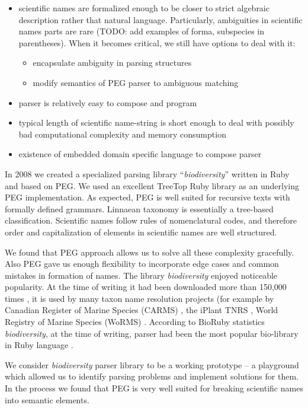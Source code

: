 \documentclass{bmcart}
\begin{document}
\begin{itemize}
  \item scientific names are formalized enough to be closer to strict
  algebraic description rather that natural language. Particularly,
  ambiguities in scientific names parts are rare (TODO:  add examples of forma,
  subspecies in parentheses). When it becomes critical, we still have
  options to deal with it:
    \begin{itemize}
      \item encapsulate ambiguity in parsing structures
      \item modify semantics of PEG parser to ambiguous matching
    \end{itemize}
  \item parser is relatively easy to compose and program
  \item typical length of scientific name-string is short enough to deal with
  possibly bad computational complexity and memory consumption
  \item existence of embedded domain specific language to compose parser
\end{itemize}

In 2008 we created a specialized parsing library ``\textit{biodiversity}''
\cite{biodiversity} written in Ruby and based on PEG. We used an excellent
TreeTop Ruby library \cite{treetop} as an underlying PEG implementation. As
expected, PEG is well suited for recursive texts with formally defined
grammars. Linnaean taxonomy is essentially a tree-based classification.
Scientific names follow rules of nomenclatural codes, and therefore order and
capitalization of elements in scientific names are well structured.

We found that PEG approach allows us to solve all these complexity gracefully.
Also PEG gave us enough flexibility to incorporate edge cases and common
mistakes in formation of names. The library \textit{biodiversity} enjoyed
noticeable popularity. At the time of writing it had been downloaded more than
150,000 times \cite{bdiv-downloads}, it is used by many taxon name resolution
projects (for example by Canadian Register of Marine Species (CARMS)
\cite{carms}, the iPlant TNRS \cite{iplant}, World Registry of Marine Species
(WoRMS) \cite{worms}.  According to BioRuby statistics \textit{biodiversity},
at the time of writing, parser had been the most popular bio-library in Ruby
language \cite{biogems}.

We consider \textit{biodiversity} parser library to be a working prototype --
a playground which allowed us to identify parsing problems and implement
solutions for them. In the process we found that PEG is very well suited for
breaking scientific names into semantic elements.
\end{document}
